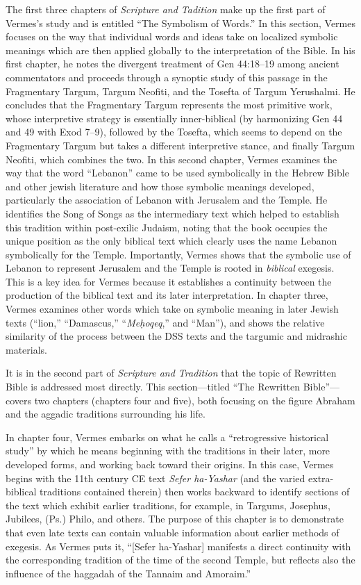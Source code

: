 The first three chapters of \emph{Scripture and Tadition} make up the
first part of Vermes's study and is entitled ``The Symbolism of Words.''
In this section, Vermes focuses on the way that individual words and
ideas take on localized symbolic meanings which are then applied
globally to the interpretation of the Bible. In his first chapter, he
notes the divergent treatment of Gen 44:18--19 among ancient
commentators and proceeds through a synoptic study of this passage in
the Fragmentary Targum, Targum Neofiti, and the Tosefta of Targum
Yerushalmi. He concludes that the Fragmentary Targum represents the most
primitive work, whose interpretive strategy is essentially
inner-biblical (by harmonizing Gen 44 and 49 with Exod 7--9), followed
by the Tosefta, which seems to depend on the Fragmentary Targum but
takes a different interpretive stance, and finally Targum Neofiti, which
combines the two. In this second chapter, Vermes examines the way that
the word ``Lebanon'' came to be used symbolically in the Hebrew Bible
and other jewish literature and how those symbolic meanings developed,
particularly the association of Lebanon with Jerusalem and the Temple.
He identifies the Song of Songs as the intermediary text which helped to
establish this tradition within post-exilic Judaism, noting that the
book occupies the unique position as the only biblical text which
clearly uses the name Lebanon symbolically for the Temple. Importantly,
Vermes shows that the symbolic use of Lebanon to represent Jerusalem and
the Temple is rooted in \emph{biblical} exegesis. This is a key idea for
Vermes because it establishes a continuity between the production of the
biblical text and its later interpretation. In chapter three, Vermes
examines other words which take on symbolic meaning in later Jewish
texts (``lion,'' ``Damascus,'' ``\emph{Meḥoqeq},'' and ``Man''), and
shows the relative similarity of the process between the DSS texts and
the targumic and midrashic materials.

It is in the second part of \emph{Scripture and Tradition} that the
topic of Rewritten Bible is addressed most directly. This
section---titled ``The Rewritten Bible''--- covers two chapters
(chapters four and five), both focusing on the figure Abraham and the
aggadic traditions surrounding his life.

In chapter four, Vermes embarks on what he calls a ``retrogressive
historical study'' by which he means beginning with the traditions in
their later, more developed forms, and working back toward their
origins. In this case, Vermes begins with the 11th century CE text
\emph{Sefer ha-Yashar} (and the varied extra-biblical traditions
contained therein) then works backward to identify sections of the text
which exhibit earlier traditions, for example, in Targums, Josephus,
Jubilees, (Ps.) Philo, and others. The purpose of this chapter is to
demonstrate that even late texts can contain valuable information about
earlier methods of exegesis. As Vermes puts it, ``{[}Sefer ha-Yashar{]}
manifests a direct continuity with the corresponding tradition of the
time of the second Temple, but reflects also the influence of the
haggadah of the Tannaim and Amoraim.''\autocite[95]{vermes1961}

